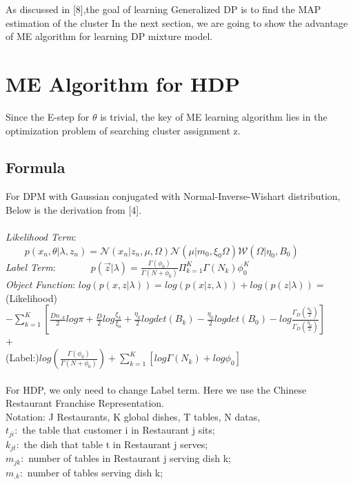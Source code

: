 \documentclass{article}
\begin{document}
As discussed in [8],the goal of learning Generalized DP is to find the MAP estimation of the cluster
In the next section, we are going to show the advantage of ME algorithm for learning DP mixture model.

\section{ME Algorithm for HDP}  
Since the E-step for $\theta$ is trivial, the key of ME learning algorithm lies in the optimization problem of searching cluster assignment z.
\subsection{Formula}
For DPM with Gaussian conjugated with Normal-Inverse-Wishart distribution, Below is the derivation from [4].\\ \\ 
\emph{Likelihood Term}:$\ \ \ \ \ \ \ \ \ p(x_{n},\theta|\lambda,z_{n})=\mathcal{N}(x_{n}|z_{n},\mu,\Omega)
\mathcal{N}(\mu|m_{0},\xi_{0}\Omega)\mathcal{W}(\Omega|\eta_{0},B_{0})$\\ 
\emph{Label Term}: $\ \ \ \ \ \ \ \ \ \ \ \ \ \ \ p(\vec z|\lambda)=\frac{\Gamma(\phi_{0})}{\Gamma(N+\phi_{0})}\Pi_{k=1}^{K}\Gamma(N_{k}) \phi_{0}^{K}$\\
\emph{Object Function}: $log(p(x,z|\lambda))=log(p(x|z,\lambda))+log(p(z|\lambda))=$\\
(Likelihood)$ -\sum_{k=1}^{K} [\frac{D n_{..k}}{2}log\pi+\frac{D}{2}log\frac{\xi_{k}}{\xi_{0}}+\frac{\eta_{k}}{2}log det(B_{k})-\frac{\eta_{0}}{2}log det(B_{0})
-log \frac{\Gamma_{D}(\frac{\eta_{k}}{2})}{\Gamma_{D}(\frac{\eta_{0}}{2})}]$
\\
+
\\
(Label:)$log(\frac{\Gamma(\phi_{0})}{\Gamma(N+\phi_{0})})+\sum_{k=1}^{K}[log \Gamma(N_{k})+log\phi_{0}]$\\ \\
For HDP, we only need to change Label term. Here we use the Chinese Restaurant Franchise Representation.\\
Notation: J Restaurants, K global dishes, T tables, N datas,\\
$t_{ji}:$ the table that customer i in Restaurant j sits;\\
$k_{jt}:$ the dish that table t in Restaurant j serves;\\
$m_{jk}:$ number of tables in Restaurant j serving dish k;\\
$m_{.k}:$ number of tables serving dish k;\\
\end{document}
